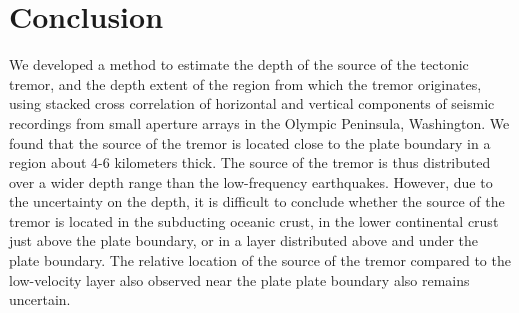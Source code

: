 \documentclass[draft]{agujournal2019}
\begin{document}
\section{Conclusion}

We developed a method to estimate the depth of the source of the tectonic tremor, and the depth extent of the region from which the tremor originates, using stacked cross correlation of horizontal and vertical components of seismic recordings from small aperture arrays in the Olympic Peninsula, Washington. We found that the source of the tremor is located close to the plate boundary in a region about 4-6 kilometers thick. The source of the tremor is thus distributed over a wider depth range than the low-frequency earthquakes. However, due to the uncertainty on the depth, it is difficult to conclude whether the source of the tremor is located in the subducting oceanic crust, in the lower continental crust just above the plate boundary, or in a layer distributed above and under the plate boundary. The relative location of the source of the tremor compared to the low-velocity layer also observed near the plate plate boundary also remains uncertain.


\end{document}
